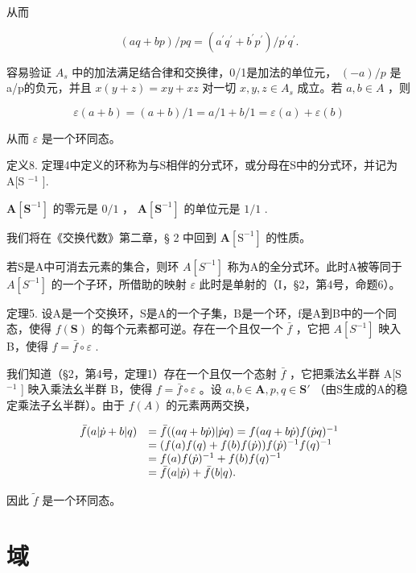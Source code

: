 从而

\[
(a q + b p) / p q = (a ^ {\prime} q ^ {\prime} + b ^ {\prime} p ^ {\prime}) / p ^ {\prime} q ^ {\prime}.
\]

容易验证 \(A_{s}\) 中的加法满足结合律和交换律，0/1是加法的单位元， \((-a)/p\) 是a/p的负元，并且 \(x(y + z) = xy + xz\) 对一切 \(x, y, z \in A_{s}\) 成立。若 \(a, b \in A\) ，则

\[
\varepsilon (a + b) = (a + b) / 1 = a / 1 + b / 1 = \varepsilon (a) + \varepsilon (b)
\]

从而 \(\varepsilon\) 是一个环同态。

定义8. 定理4中定义的环称为与S相伴的分式环，或分母在S中的分式环，并记为A{[}S \(^{-1}\) {]}.

\(\mathbf{A}[\mathbf{S}^{-1}]\) 的零元是 \(0 / 1\) ， \(\mathbf{A}[\mathbf{S}^{-1}]\) 的单位元是 \(1 / 1\) .

我们将在《交换代数》第二章，§ 2 中回到 \(\mathbf{A}[\mathrm{S}^{-1}]\) 的性质。

若S是A中可消去元素的集合，则环 \(A[S^{-1}]\) 称为A的全分式环。此时A被等同于 \(A[S^{-1}]\) 的一个子环，所借助的映射 \(\varepsilon\) 此时是单射的（I，§2，第4号，命题6）。

定理5. 设A是一个交换环，S是A的一个子集，B是一个环，f是A到B中的一个同态，使得 \(f(\mathbf{S})\) 的每个元素都可逆。存在一个且仅一个 \(\bar{f}\) ，它把 \(A[S^{-1}]\) 映入 B，使得 \(f = \bar{f} \circ \varepsilon\) .

我们知道（§2，第4号，定理1）存在一个且仅一个态射 \(\bar{f}\) ，它把乘法幺半群 A{[}S \(^{-1}\) {]} 映入乘法幺半群 B，使得 \(f = \bar{f} \circ \varepsilon\) 。设 \(a, b \in \mathbf{A}, p, q \in \mathbf{S}'\) （由S生成的A的稳定乘法子幺半群）。由于 \(f(A)\) 的元素两两交换，

\[
\begin{array}{r l} \bar {f} (a | \dot {p} + b | q) & = \bar {f} ((a q + b \dot {p}) | \dot {p} q) = f (a q + b \dot {p}) f (\dot {p} q) ^ {- 1} \\ & = (f (a) f (q) + f (b) f (\dot {p})) f (\dot {p}) ^ {- 1} f (q) ^ {- 1} \\ & = f (a) f (\dot {p}) ^ {- 1} + f (b) f (q) ^ {- 1} \\ & = \bar {f} (a | \dot {p}) + \bar {f} (b | q). \end{array}
\]

因此 \(\tilde{f}\) 是一个环同态。

\section{域}

